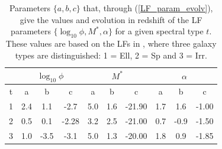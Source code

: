 \begin{table}
\centering
\caption{Parameters $\lbrace a,b,c \rbrace$ that, through (\ref{LF_param_evolv}), give the values and evolution in redshift of the LF parameters $\lbrace \log_{10}\phi, M^*, \alpha \rbrace$ for a given spectral type $t$. These values are based on the LFs in \citet{Dahlen2005}, where three galaxy types are distinguished: 1 = Ell, 2 = Sp and 3 = Irr.}
\vspace*{12pt}
\begin{tabular}{cccccccccc}
\cline{2-10}
& \multicolumn{3}{c}{$\log_{10}\phi$} & \multicolumn{3}{c}{$M^*$} & \multicolumn{3}{c}{$\alpha$}\\
\hline
\multicolumn{1}{c}{t} & a & b & c & a & b & c & a & b & c\\
\hline
\multicolumn{1}{c}{1} & 2.4 & 1.1 & -2.7 & 5.0 & 1.6 &-21.90 & 1.7 & 1.6 & -1.00 \\
\multicolumn{1}{c}{2} & 0.5 & 0.1 & -2.28 & 3.2 & 2.5 & -21.00 & 0.7 & -0.9 & -1.50 \\
\multicolumn{1}{c}{3} & 1.0 & -3.5 & -3.1 & 5.0 & 1.3 & -20.00 & 1.8 & 0.9 & -1.85 \\
\hline
\end{tabular}
\label{LF_parameters}
\end{table}

